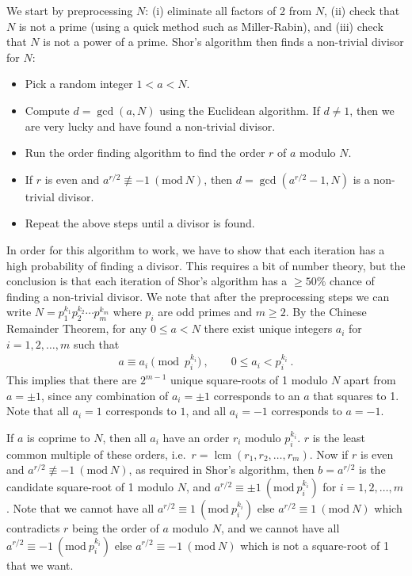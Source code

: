 \documentclass{article}
\DeclareMathOperator{\lcm}{lcm}
\newcommand{\Mod}[1]{\ (\mathrm{mod}\ #1)}
\numberwithin{equation}{section} 		%
\begin{document}
We start by preprocessing $N$: (i) eliminate all factors of 2 from $N$, (ii) check that $N$ is not a prime (using a quick method such as Miller-Rabin), and (iii) check that $N$ is not a power of a prime.
Shor's algorithm then finds a non-trivial divisor for $N$:

\begin{itemize}
	\item Pick a random integer $1 < a < N$.
	\item Compute $d = \gcd(a, N)$ using the Euclidean algorithm. If $d \neq 1$, then we are very lucky and have found a non-trivial divisor.
	\item Run the order finding algorithm to find the order $r$ of $a$ modulo $N$.
	\item If $r$ is even and $a^{r/2} \not\equiv -1 \Mod N$, then $d = \gcd(a^{r/2} - 1, N)$ is a non-trivial divisor.
	\item Repeat the above steps until a divisor is found.
\end{itemize}

In order for this algorithm to work, we have to show that each iteration has a high probability of finding a divisor.
This requires a bit of number theory, but the conclusion is that each iteration of Shor's algorithm has a $\geq 50\%$ chance of finding a non-trivial divisor.
We note that after the preprocessing steps we can write $N = p_1^{k_1} p_2^{k_2} \cdots p_m^{k_m}$ where $p_i$ are odd primes and $m \geq 2$.
By the Chinese Remainder Theorem, for any $0 \leq a < N$ there exist unique integers $a_i$ for $i = 1, 2, \dotsc, m$ such that
\begin{align}
	a \equiv a_i \pmod{p_i^{k_i}} ~, \qquad 0 \leq a_i < p_i^{k_i} ~.
\end{align}
This implies that there are $2^{m-1}$ unique square-roots of 1 modulo $N$ apart from $ a = \pm 1$, since any combination of $a_i = \pm 1$ corresponds to an $a$ that squares to 1.
Note that all $a_i = 1$ corresponds to $1$, and all $a_i = -1$ corresponds to $a = -1$.

If $a$ is coprime to $N$, then all $a_i$ have an order $r_i$ modulo $p_i^{k_i}$.
$r$ is the least common multiple of these orders, i.e.~$r = \lcm(r_1, r_2, \dotsc, r_m)$.
Now if $r$ is even and $a^{r/2} \not\equiv -1 \Mod N$, as required in Shor's algorithm, then $b = a^{r/2}$ is the candidate square-root of 1 modulo $N$, and
$a^{r/2} \equiv \pm 1 \Mod{p_i^{k_i}}$ for $i = 1, 2, \dotsc, m$.
Note that we cannot have all $a^{r/2} \equiv 1 \Mod{p_i^{k_i}}$ else $a^{r/2} \equiv 1 \Mod N$ which contradicts $r$ being the order of $a$ modulo $N$, and we cannot have all $a^{r/2} \equiv -1 \Mod{p_i^{k_i}}$ else $a^{r/2} \equiv -1 \Mod N$ which is not a square-root of 1 that we want.
\end{document}

